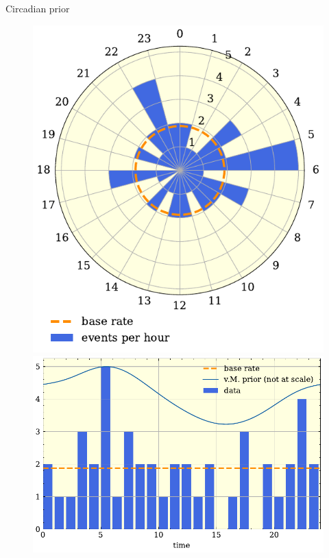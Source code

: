 \documentclass[t]{beamer}
\theoremstyle{definition}
\begin{document}
\begin{frame}
\begin{columns}
    \begin{column}{0.45\textwidth}
        \begin{block}{Circadian prior}
        \begin{figure}
            \begin{overprint}
            \centering
            \includegraphics[width=\textwidth]{figs/polar_hist.pdf}
            \centering
            \includegraphics[width=\textwidth]{figs/vm_prior.pdf}
            \end{overprint}
        \end{figure}
        \end{block}
        

\end{column}
\end{columns}
\end{frame}
\end{document}
